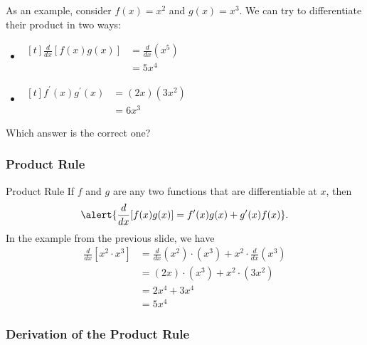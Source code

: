 \documentclass[cal1spr16Lectures.tex]{subfiles}
\begin{document}
\begin{frame}\footnotesize
As an example, consider $f(x)=x^2$ and $g(x)=x^3$.  We can try to differentiate their product in two ways:
\begin{itemize}\footnotesize
\item $\begin{aligned}[t]
	\frac{d}{dx}[f(x)g(x)] &= \frac{d}{dx}\left(x^5 \right) \\[0.25pc]
	 &= 5x^4
	\end{aligned}$
\item $\begin{aligned}[t]
	f^{\prime}(x)g^{\prime}(x) &= (2x)(3x^2) \\
	 &= 6x^3
	 \end{aligned}$
\end{itemize}
\begin{que}Which answer is the correct one? \end{que}
\end{frame}

\subsubsection{Product Rule}

\begin{frame}{\small Product Rule}\footnotesize
If $f$ and $g$ are any two functions that are differentiable at $x$, then
\[\alert{\frac{d}{dx}[f(x) g(x)] = f^{\prime}(x) g(x) + g^{\prime}(x) f(x)}.\]
In the example from the previous slide, we have
\begin{align*}
\frac{d}{dx}[x^2\cdot x^3] &= \frac{d}{dx}(x^2)\cdot (x^3)+x^2\cdot\frac{d}{dx}(x^3) \\
 &= (2x)\cdot (x^3)+x^2\cdot (3x^2) \\[0.25pc]
 &= 2x^4+3x^4 \\[0.25pc]
 &= 5x^4
\end{align*}
\end{frame}

\subsubsection{Derivation of the Product Rule}
\end{document}
